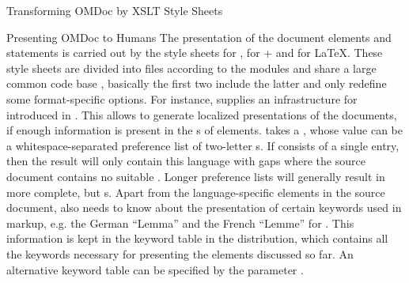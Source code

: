 \begin{tchapter}[id=transform-xsl,short=Transforming OMDoc]{Transforming OMDoc by XSLT Style Sheets}
\begin{tsection}[id=omdoc2pres]{Presenting OMDoc to Humans}
The presentation of the {\omdoc} document elements and statements is carried out by the
style sheets {} for {\xhtml}, {} for
{\xhtml}+{\mathml} and {} for {\LaTeX}. These style sheets are
divided into files according to the {\omdoc} modules and share a large common code base
{}, basically the first two include the latter and only
redefine some format-specific options. For instance, {}
supplies an infrastructure for {} introduced in
{}. This allows to generate localized presentations of the {\omdoc}
documents, if enough information is present in the
{s} of
{} elements. {} takes a {}
{}, whose value can be a whitespace-separated preference list of
{} two-letter {s}.  If
{} consists of a single entry, then the result will only contain
this language with gaps where the source document contains no suitable {}.
Longer {} preference lists will generally result in more
complete, but {s}. Apart from the language-specific
elements in the source document, {} also needs to know about the
presentation of certain keywords used in {\omdoc} markup, e.g.  the German ``Lemma'' and
the French ``Lemme'' for {}. This information is kept in
the keyword table {} in the {\omdoc} distribution, which contains
all the keywords necessary for presenting the {\omdoc} elements discussed so far.  An
alternative keyword table can be specified by the parameter {}
{}.
\end{tsection}
\end{tchapter}

